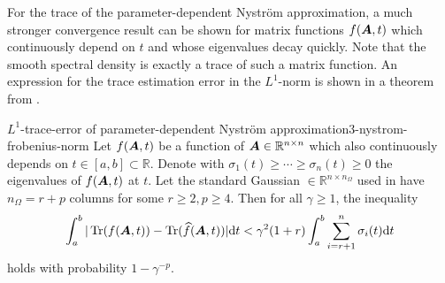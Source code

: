 For the trace of the parameter-dependent Nystr\"om approximation,
a much stronger convergence result can be shown for matrix functions $f(\boldsymbol{A}, t)$
which continuously depend on $t$ and whose eigenvalues decay quickly.
Note that the smooth spectral density 
is exactly a trace of such a matrix function.
An expression for the trace estimation error in
the $L^1$-norm is shown in a theorem from \cite{he2023parameter}.
\begin{theorem}{$L^1$-trace-error of parameter-dependent Nystr\"om approximation}{3-nystrom-frobenius-norm}
    Let $f(\boldsymbol{A}, t)$ be a function of $\boldsymbol{A} \in \mathbb{R}^{n \times n}$ which
    also continuously depends on $t \in [a,b] \subset \mathbb{R}$. 
    Denote with $\sigma_1(t) \geq \cdots \geq \sigma_n(t) \geq 0$ the eigenvalues of $f(\boldsymbol{A}, t)$ at $t$. Let the
    standard Gaussian  $\in \mathbb{R}^{n \times n_{\Omega}}$
    used in  have
    $n_{\Omega} = r + p$ columns for some $r \geq 2, p \geq 4$. Then
    for all $\gamma \geq 1$, the inequality
    \begin{equation}
        \int_{a}^{b} | \operatorname{Tr}(f(\boldsymbol{A}, t)) - \operatorname{Tr}(\widehat{f}(\boldsymbol{A}, t))| \mathrm{d}t
            < \gamma^2 (1 + r) \int_{a}^{b} \sum_{i = r+1}^n \sigma_i(t) \mathrm{d}t
    \end{equation}
    holds with probability $1 - \gamma^{-p}$.
\end{theorem}


